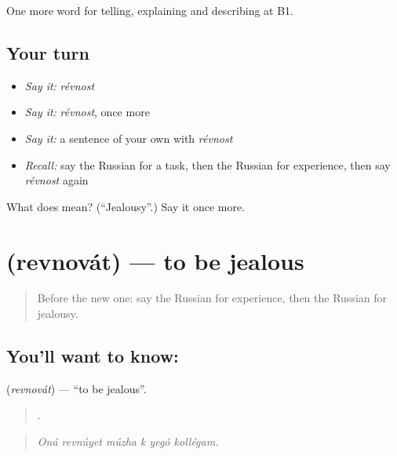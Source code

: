 \begin{grammarlens}[title={What you've built}]
One more word for telling, explaining and describing at B1.
\end{grammarlens}

\subsection*{Your turn}
\begin{itemize}
\raggedright
  \item \emph{Say it:} \emph{révnost}
  \item \emph{Say it:} \emph{révnost}, once more
  \item \emph{Say it:} a sentence of your own with \emph{révnost}
  \item \emph{Recall:} say the Russian for a task, then the Russian for experience, then say \emph{révnost} again
\end{itemize}

\begin{tcolorbox}[breakable,colback=teal!4,colframe=teal!35!black,title={Before you move on}]
What does  mean? (\textquotedblleft{}Jealousy\textquotedblright{}.) Say it once more.
\end{tcolorbox}
\section[\texorpdfstring{\ru{ревновать} (revnovát)}{ревновать (revnovát)}]{ (revnovát) — to be jealous}

\label{lesson:RU-C469-revnovat}



\begin{quote}
Before the new one: say the Russian for experience, then the Russian for jealousy.
\end{quote}

\subsection*{You'll want to know: }
\textbf{} (\emph{revnovát}) — \textquotedblleft{}to be jealous\textquotedblright{}.

\begin{quote}
     .
\end{quote}

\begin{quote}
\emph{Oná revnúyet múzha k yegó kollégam.}
\end{quote}

